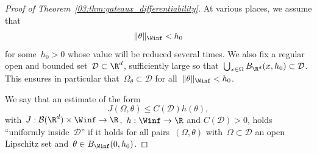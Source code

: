 \begin{proof}[Proof of Theorem~\ref{03:thm:gateaux_differentiability}]
    At various places, we assume that
    $$\|\theta\|_{\Winf} < h_0$$
    for some~$h_0>0$ whose value will be reduced several times.
    We also fix a regular open and bounded set~$\mathcal D\subset\R^d$, sufficiently large so that~$\bigcup_{x\in \Omega} B_{\R^d}(x,h_0)\subset \mathcal D$. This ensures in particular that~$\Omega_\theta\subset \mathcal D$ for all~$\|\theta\|_{\Winf}< h_0$.

    We say that an estimate of the form
    \begin{equation}
        J(\Omega,\theta) \leq C(\mathcal D)h(\theta),
    \end{equation}
    with~$J : \mathcal B(\R^d)\times \Winf \to \R$,~$h:\Winf\to\R$ and $C(\mathcal D)>0$, holds ``uniformly inside~$\mathcal D$'' if it holds for all pairs~$(\Omega,\theta)$ with~$\Omega\subset \mathcal D$ an open Lipschitz set and~$\theta\in B_{\Winf}(0,h_0)$.


\end{proof}
